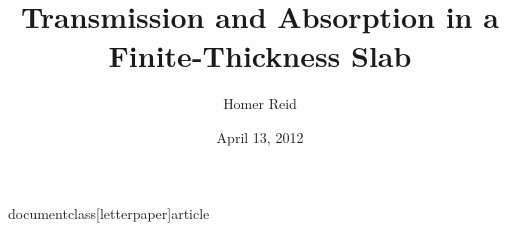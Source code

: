 documentclass[letterpaper]{article}



\graphicspath{{figures/}}


\title {Transmission and Absorption in a Finite-Thickness Slab} 
\author {Homer Reid}
\date {April 13, 2012}



\pagestyle{myheadings}
\maketitle




